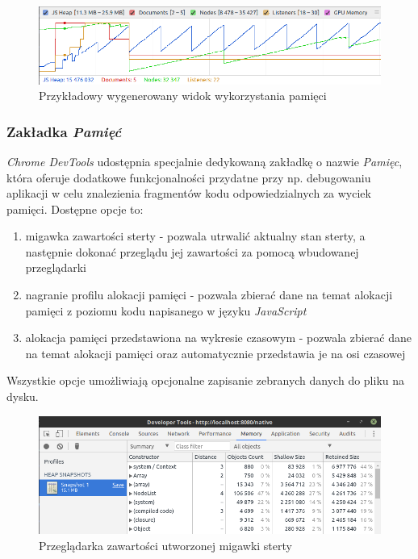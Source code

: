 \documentclass[polish, twoside, 12pt]{mwart}
\begin{document}
\begin{figure}[ht]
  \includegraphics[width=\textwidth]{chrome-devtools-performance-memory-view.png}
	\caption{Przykładowy wygenerowany widok wykorzystania pamięci}
\end{figure}

\subsubsection{Zakładka \emph{Pamięć}}

\emph{Chrome DevTools} udostępnia specjalnie dedykowaną zakładkę o nazwie \emph{Pamięc}, która oferuje dodatkowe funkcjonalności przydatne przy np. debugowaniu aplikacji w celu znalezienia fragmentów kodu odpowiedzialnych za wyciek pamięci. Dostępne opcje to:

\begin{enumerate}
  \item migawka zawartości sterty - pozwala utrwalić aktualny stan sterty, a następnie dokonać przeglądu jej zawartości za pomocą wbudowanej przeglądarki
  \item nagranie profilu alokacji pamięci - pozwala zbierać dane na temat alokacji pamięci z poziomu kodu napisanego w języku \emph{JavaScript}
  \item alokacja pamięci przedstawiona na wykresie czasowym - pozwala zbierać dane na temat alokacji pamięci oraz automatycznie przedstawia je na osi czasowej
\end{enumerate}

Wszystkie opcje umożliwiają opcjonalne zapisanie zebranych danych do pliku na dysku.

\begin{figure}[ht]
  \includegraphics[width=\textwidth]{chrome-devtools-performance-heap-snapshot.png}
	\caption{Przeglądarka zawartości utworzonej migawki sterty}
\end{figure}
\end{document}
